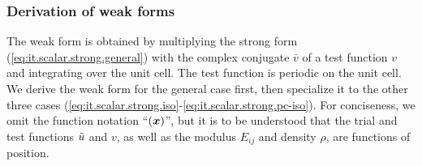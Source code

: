 \subsubsection{Derivation of weak forms} \label{sec:it.scalar.weak-derivation}

The weak form is obtained by multiplying the strong form (\ref{eq:it.scalar.strong.general}) with the complex conjugate \(\bar{v}\) of a test function \(v\) and integrating over the unit cell. The test function is periodic on the unit cell. We derive the weak form for the general case first, then specialize it to the other three cases (\ref{eq:it.scalar.strong.iso}-\ref{eq:it.scalar.strong.pc-iso}). For conciseness, we omit the function notation ``\((\boldsymbol{x})\)'', but it is to be understood that the trial and test functions \(\tilde{u}\) and \(v\), as well as the modulus \(E_{ij}\) and density \(\rho\), are functions of position.

